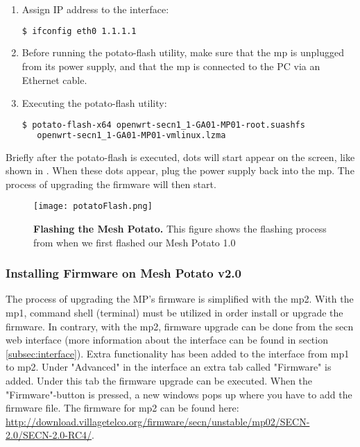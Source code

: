 \begin{enumerate}
\begin{enumerate}
\item Assign IP address to the interface:
\noindent 
\begin{lstlisting}[language=bash]
  $ ifconfig eth0 1.1.1.1
\end{lstlisting}

\item Before running the potato-flash utility, make sure that the \gls{mp} is unplugged from its power supply, and that the \gls{mp} is connected to the PC via an Ethernet cable. 

\item Executing the potato-flash utility:
\noindent
\begin{lstlisting}[language=bash]
  $ potato-flash-x64 openwrt-secn1_1-GA01-MP01-root.suashfs 
   openwrt-secn1_1-GA01-MP01-vmlinux.lzma
\end{lstlisting}
\end{enumerate}
\end{enumerate}

Briefly after the potato-flash is executed, dots will start appear on the screen, like shown in . When these dots appear, plug the power supply back into the \gls{mp}. The process of upgrading the firmware will then start. 

\begin{figure}[b]
  \centering
      \texttt{[image: potatoFlash.png]}
  \caption [Flashing the Mesh Potato]{\textbf{Flashing the Mesh Potato.} This figure shows the flashing process from when we first flashed our Mesh Potato 1.0}
  \label{fig:flashing}
\end{figure}


\subsubsection{Installing Firmware on Mesh Potato v2.0}
The process of upgrading the MP's firmware is simplified with the \gls{mp2}. With the \gls{mp1}, command shell (terminal) must be utilized in order install or upgrade the firmware. In contrary, with the \gls{mp2}, firmware upgrade can be done from the \gls{secn} web interface (more information about the interface can be found in section \ref{subsec:interface}). Extra functionality has been added to the interface from \gls{mp1} to \gls{mp2}. Under "Advanced" in the interface an extra tab called "Firmware" is added. Under this tab the firmware upgrade can be executed. When the "Firmware"-button is pressed, a new windows pops up where you have to add the firmware file. The firmware for \gls{mp2} can be found here: \url{http://download.villagetelco.org/firmware/secn/unstable/mp02/SECN-2.0/SECN-2.0-RC4/}.

